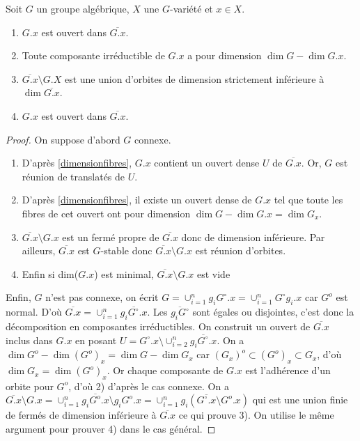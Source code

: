\begin{prop}
Soit $G$ un groupe algébrique, $X$ une $G$-variété et $x\in X$.
\begin{enumerate}
\item $G.x$ est ouvert dans $\overline{G.x}$.
\item Toute composante irréductible de $G.x$ a pour dimension $\dim G-\dim G.x$.
\item $\overline{G.x}\setminus G.X$ est une union d'orbites de dimension strictement inférieure à $\dim \overline{G.x}$.
\item $G.x$ est ouvert dans $\overline{G.x}$.
\end{enumerate}
\end{prop}
\begin{proof}
On suppose d'abord $G$ connexe.
\begin{enumerate}
\item D'après \ref{dimensionfibres}, $G.x$ contient un ouvert dense $U$ de $\overline{G.x}$. Or, $G$ est réunion de translatés de $U$.
\item D'après \ref{dimensionfibres}, il existe un ouvert dense de $G.x$ tel que toute les fibres de cet ouvert ont pour dimension $\dim G-\dim G.x=\dim G_x$.
\item $\overline{G.x}\setminus G.x$ est un fermé propre de $\overline{G.x}$ donc de dimension inférieure. Par ailleurs, $\overline{G.x}$ est $G$-stable donc $\overline{G.x}\setminus G.x$ est réunion d'orbites.
\item Enfin si dim($G.x$) est minimal, $\overline{G.x}\setminus G.x$ est vide
\end{enumerate}
Enfin, $G$ n'est pas connexe, on écrit $G=\cup_{i=1}^{n}g_iG^\circ .x=\cup_{i=1}^{n}G^\circ g_i.x$ car $G^o$ est normal. D'où $\overline{G.x}=\cup_{i=1}^{n}\overline{g_iG^\circ .x}$. Les $\overline{g_iG^\circ}$ sont égales ou disjointes, c'est donc la décomposition en composantes irréductibles. On construit un ouvert de $\overline{G.x}$ inclus dans $G.x$ en posant $U=G^\circ .x\setminus \cup_{i=2}^{n}\overline{g_iG^\circ .x}$. On a $\dim G^o-\dim (G^o) _x=\dim G -\dim G_x$ car $(G_x)^o \subset(G^o)_x \subset G_x$, d'où $\dim G_x=\dim (G^o) _x$. Or chaque composante de $G.x$ est l'adhérence d'un orbite pour $G^o$, d'où 2) d'après le cas connexe. On a $\overline{G.x}\setminus G.x=\cup_{i=1}^{n}\overline{g_iG^o .x}\setminus g_iG^o .x=\cup_{i=1}^{n}g_i(\overline{G^\circ .x}\setminus G^o .x)$ qui est une union finie de fermés de dimension inférieure à $\overline{G .x}$ ce qui prouve 3). On utilise le même argument pour prouver 4) dans le cas général.
\end{proof}

